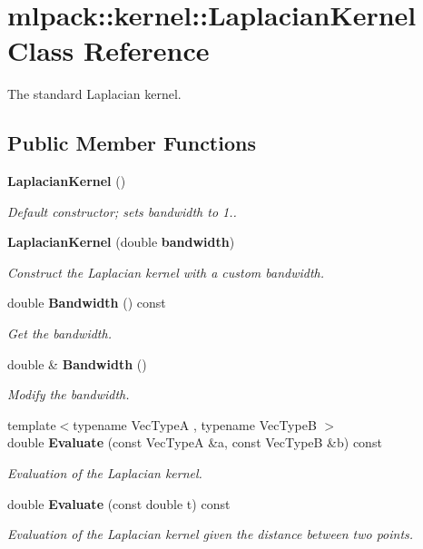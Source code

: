 \section{mlpack\+:\+:kernel\+:\+:Laplacian\+Kernel Class Reference}
\label{classmlpack_1_1kernel_1_1LaplacianKernel}


The standard Laplacian kernel.  


\subsection*{Public Member Functions}
\begin{DoxyCompactItemize}
\item 
{\bf Laplacian\+Kernel} ()
\begin{DoxyCompactList}\small\item\em Default constructor; sets bandwidth to 1.. \end{DoxyCompactList}\item 
{\bf Laplacian\+Kernel} (double {\bf bandwidth})
\begin{DoxyCompactList}\small\item\em Construct the Laplacian kernel with a custom bandwidth. \end{DoxyCompactList}\item 
double {\bf Bandwidth} () const 
\begin{DoxyCompactList}\small\item\em Get the bandwidth. \end{DoxyCompactList}\item 
double \& {\bf Bandwidth} ()
\begin{DoxyCompactList}\small\item\em Modify the bandwidth. \end{DoxyCompactList}\item 
{\footnotesize template$<$typename Vec\+TypeA , typename Vec\+TypeB $>$ }\\double {\bf Evaluate} (const Vec\+TypeA \&a, const Vec\+TypeB \&b) const 
\begin{DoxyCompactList}\small\item\em Evaluation of the Laplacian kernel. \end{DoxyCompactList}\item 
double {\bf Evaluate} (const double t) const 
\begin{DoxyCompactList}\small\item\em Evaluation of the Laplacian kernel given the distance between two points. \end{DoxyCompactList}\item 

\end{DoxyCompactItemize}
